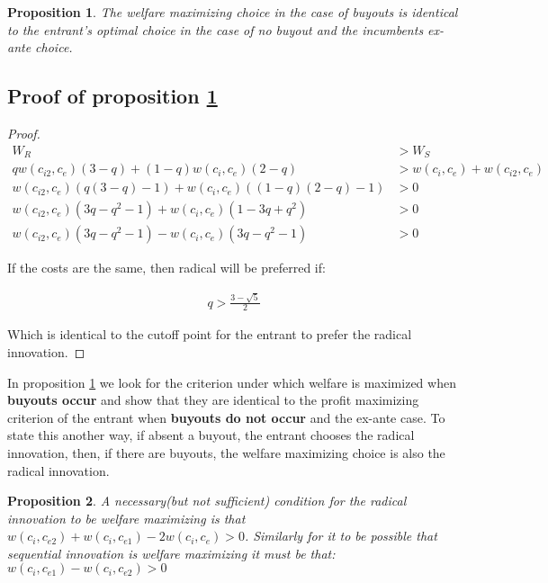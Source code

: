 \documentclass[12pt]{report}
\newtheorem{proposition}{Proposition}
\numberwithin{equation}{section}
\begin{document}
\begin{proposition}\label{propwelfare}
The welfare maximizing choice in the case of buyouts is identical to the entrant's optimal choice in the case of no buyout and the incumbents ex-ante choice. 
\end{proposition}

\subsection{Proof of proposition \ref{propwelfare}}

\begin{proof} \label{buyoutnobuyout}
\begin{align*}
W_R&> W_S \\
q w(c_{i2}, c_{e})(3-q )
+(1-q)w(c_{i}, c_{e})(2-q) &> w(c_{i}, c_{e}) + w(c_{i2}, c_{e}) \\
 w(c_{i2}, c_{e})(q(3-q) -1)
+w(c_{i}, c_{e})((1-q)(2-q)-1)  &> 0 \\
w(c_{i2}, c_{e})(3q-q^2-1)+w(c_{i}, c_{e})(1-3q+q^2)&>0 \\
 w(c_{i2}, c_{e})(3q-q^2-1)-w(c_{i}, c_{e})(3q-q^2-1) &>0 
\end{align*}

If the costs are the same, then radical will be preferred if:

\begin{align}
q> \frac{3-\sqrt{5}}{2}
\end{align}

Which is identical to the cutoff point for the entrant to prefer the radical innovation. 

\end{proof}

In proposition \ref{propwelfare} we look for the criterion under which welfare is maximized when \textbf{ buyouts occur} and show that they are identical to the profit maximizing criterion of the entrant when \textbf{buyouts do not occur} and the ex-ante case. To state this another way, if absent a buyout, the entrant chooses the radical innovation, then, if there are buyouts, the welfare maximizing choice is also the radical innovation. 

\begin{proposition}
\label{welfare1}
A necessary(but not sufficient) condition for the radical innovation to be welfare maximizing is that $w(c_{i}, c_{e2})+w(c_{i}, c_{e1})-2 w(c_{i}, c_{e}) > 0 $. 
Similarly for it to be possible that sequential innovation is welfare maximizing it must be that: 
$w(c_{i}, c_{e1})-w(c_{i}, c_{e2}) > 0$
\end{proposition}
\end{document}
